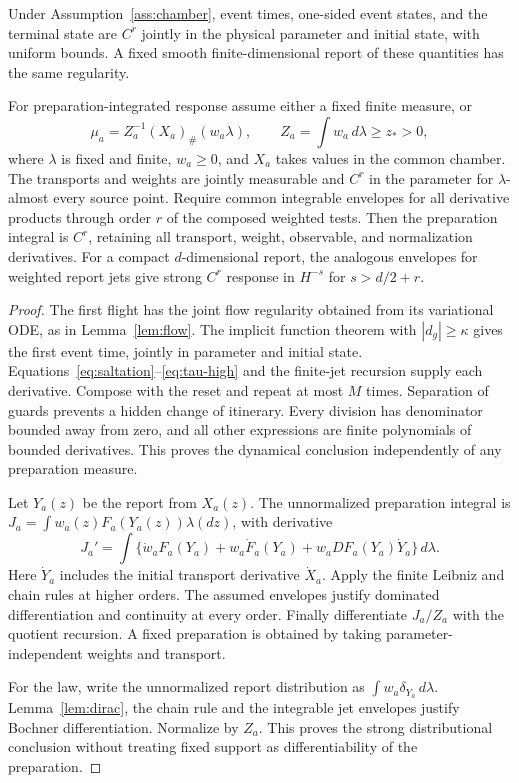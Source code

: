\begin{theorem}\label{thm:chamber}
Under Assumption~\ref{ass:chamber}, event times, one-sided event states, and the terminal state are $C^r$ jointly in the physical parameter and initial state, with uniform bounds. A fixed smooth finite-dimensional report of these quantities has the same regularity.

For preparation-integrated response assume either a fixed finite measure, or
\[
 \mu_a=Z_a^{-1}(X_a)_\#(w_a\lambda),\qquad
 Z_a=\int w_a\,d\lambda\ge z_*>0,
\]
where $\lambda$ is fixed and finite, $w_a\ge0$, and $X_a$ takes values in the common chamber. The transports and weights are jointly measurable and $C^r$ in the parameter for $\lambda$-almost every source point. Require common integrable envelopes for all derivative products through order $r$ of the composed weighted tests. Then the preparation integral is $C^r$, retaining all transport, weight, observable, and normalization derivatives. For a compact $d$-dimensional report, the analogous envelopes for weighted report jets give strong $C^r$ response in $H^{-s}$ for $s>d/2+r$.
\end{theorem}
\begin{proof}
The first flight has the joint flow regularity obtained from its variational ODE, as in Lemma~\ref{lem:flow}. The implicit function theorem with $|d_g|\ge\kappa$ gives the first event time, jointly in parameter and initial state. Equations~\eqref{eq:saltation}--\eqref{eq:tau-high} and the finite-jet recursion supply each derivative. Compose with the reset and repeat at most $M$ times. Separation of guards prevents a hidden change of itinerary. Every division has denominator bounded away from zero, and all other expressions are finite polynomials of bounded derivatives. This proves the dynamical conclusion independently of any preparation measure.

Let $Y_a(z)$ be the report from $X_a(z)$. The unnormalized preparation integral is
$J_a=\int w_a(z)F_a(Y_a(z))\lambda(dz)$, with derivative
\[
 J_a'=\int\{\dot w_a F_a(Y_a)+w_a\dot F_a(Y_a)
                   +w_a DF_a(Y_a)\dot Y_a\}\,d\lambda.
\]
Here $\dot Y_a$ includes the initial transport derivative $\dot X_a$. Apply the finite Leibniz and chain rules at higher orders. The assumed envelopes justify dominated differentiation and continuity at every order. Finally differentiate $J_a/Z_a$ with the quotient recursion. A fixed preparation is obtained by taking parameter-independent weights and transport.

For the law, write the unnormalized report distribution as $\int w_a\delta_{Y_a}\,d\lambda$. Lemma~\ref{lem:dirac}, the chain rule and the integrable jet envelopes justify Bochner differentiation. Normalize by $Z_a$. This proves the strong distributional conclusion without treating fixed support as differentiability of the preparation.
\end{proof}

